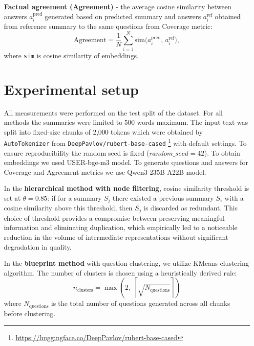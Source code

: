 \documentclass{superfri}
\begin{document}
\textbf{Factual agreement (Agreement)} - the average cosine similarity between answers $a_i^{\text{pred}}$ generated based on predicted summary and answers $a_i^{\text{ref}}$ obtained from reference summary to the same questions from Coverage metric:
\begin{equation}
  \text{Agreement} = \frac{1}{N}\sum_{i=1}^N \mathrm{sim}\bigl(a_i^{\text{pred}},\,a_i^{\text{ref}}\bigr),
\end{equation}
where \texttt{sim} is cosine similarity of embeddings.


\section{Experimental setup}

All measurements were performed on the test split of the dataset.
For all methods the summaries were limited to 500 words maximum.
The input text was split into fixed-\allowbreak size chunks of 2,000 tokens which were obtained by \texttt{AutoTokenizer} from \texttt{DeepPavlov/rubert-\allowbreak base-\allowbreak cased} \footnote{\label{pavlov}\url{https://huggingface.co/DeepPavlov/rubert-base-cased}} with default settings.
To ensure reproducibility the random seed is fixed ($random\_seed = 42$). 
To obtain embeddings we used USER-bge-m3 model. To generate questions and answers for Coverage and Agreement metrics we use Qwen3-235B-A22B \cite{qwen3} model. 

In the \textbf{hierarchical method with node filtering}, cosine similarity threshold is set at $\theta=0.85$: if for a summary $S_j$ there existed a previous summary $S_i$ with a cosine similarity above this threshold, then $S_j$ is discarded as redundant. 
This choice of threshold provides a compromise between preserving meaningful information and eliminating duplication, which empirically led to a noticeable reduction in the volume of intermediate representations without significant degradation in quality.

In the \textbf{blueprint method} with question clustering, we utilize KMeans clustering algorithm. The number of clusters is chosen using a heuristically derived rule:
\begin{equation}
  n_{\text{clusters}} = \max\!\left(2,\; \left\lceil \sqrt{N_{\text{questions}}} \right\rceil\right)
\end{equation}
where $N_{\text{questions}}$ is the total number of questions generated across all chunks before clustering.
\end{document}

